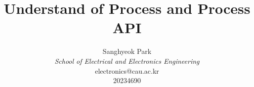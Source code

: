 \documentclass{article}
\begin{document}
\title{\textbf{Understand of Process and Process API}\\
}
\author{
    Sanghyeok Park\\
    \textit{School of Electrical and Electronics Engineering}\\
    electronics@cau.ac.kr\\
    20234690
}
\maketitle








\end{document}
